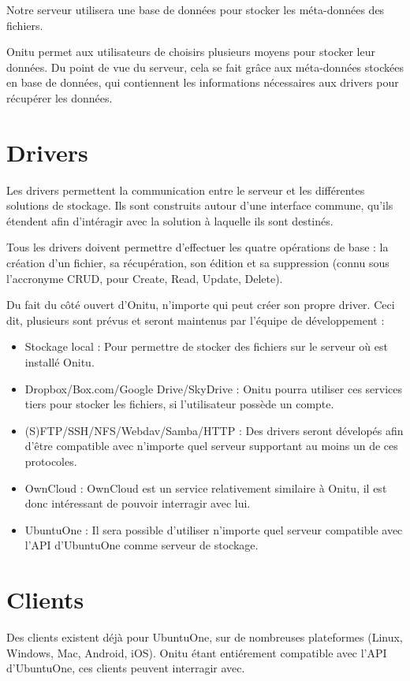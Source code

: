 Notre serveur utilisera une base de données pour stocker les méta-données des fichiers.

Onitu permet aux utilisateurs de choisirs plusieurs moyens pour stocker leur données. Du point de vue du serveur, cela se fait grâce aux méta-données stockées en base de données, qui contiennent les informations nécessaires aux drivers pour récupérer les données. 

\section{Drivers}
Les drivers permettent la communication entre le serveur et les différentes solutions de stockage. Ils sont construits autour d'une interface commune, qu'ils étendent afin d'intéragir avec la solution à laquelle ils sont destinés.

Tous les drivers doivent permettre d'effectuer les quatre opérations de base : la création d'un fichier, sa récupération, son édition et sa suppression (connu sous l'accronyme CRUD, pour Create, Read, Update, Delete).

Du fait du côté ouvert d'Onitu, n'importe qui peut créer son propre driver. Ceci dit, plusieurs sont prévus et seront maintenus par l'équipe de développement :
\begin{itemize}
    \item Stockage local : Pour permettre de stocker des fichiers sur le serveur où est installé Onitu.
    \item Dropbox/Box.com/Google Drive/SkyDrive : Onitu pourra utiliser ces services tiers pour stocker les fichiers, si l'utilisateur possède un compte.
    \item (S)FTP/SSH/NFS/Webdav/Samba/HTTP : Des drivers seront dévelopés afin d'être compatible avec n'importe quel serveur supportant au moins un de ces protocoles.
    \item OwnCloud : OwnCloud est un service relativement similaire à Onitu, il est donc intéressant de pouvoir interragir avec lui.
    \item UbuntuOne : Il sera possible d'utiliser n'importe quel serveur compatible avec l'API d'UbuntuOne comme serveur de stockage.
\end{itemize}

\section{Clients}
Des clients existent déjà pour UbuntuOne, sur de nombreuses plateformes (Linux, Windows, Mac, Android, iOS). Onitu étant entiérement compatible avec l'API d'UbuntuOne, ces clients peuvent interragir avec.

